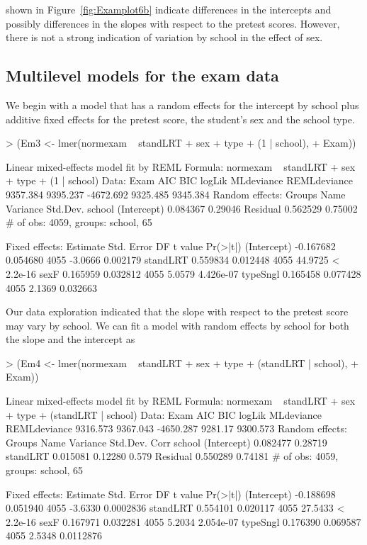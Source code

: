 \documentclass[12pt]{article}
\begin{document}
shown in Figure~\ref{fig:Examplot6b} indicate differences in the
intercepts and possibly differences in the slopes with respect to the
pretest scores.  However, there is not a strong indication of
variation by school in the effect of sex.


\subsection{Multilevel models for the exam data}
\label{sec:ExamModels}

We begin with a model that has a random effects for the intercept by
school plus additive fixed effects for the pretest score, the
student's sex and the school type.
\begin{Schunk}
\begin{Sinput}
> (Em3 <- lmer(normexam ~ standLRT + sex + type + (1 | school), 
+     Exam))
\end{Sinput}
\begin{Soutput}
Linear mixed-effects model fit by REML
Formula: normexam ~ standLRT + sex + type + (1 | school) 
   Data: Exam 
      AIC      BIC    logLik MLdeviance REMLdeviance
 9357.384 9395.237 -4672.692   9325.485     9345.384
Random effects:
 Groups   Name        Variance Std.Dev.
 school   (Intercept) 0.084367 0.29046 
 Residual             0.562529 0.75002 
# of obs: 4059, groups: school, 65

Fixed effects:
               Estimate  Std. Error   DF t value  Pr(>|t|)
(Intercept)   -0.167682    0.054680 4055 -3.0666  0.002179
standLRT       0.559834    0.012448 4055 44.9725 < 2.2e-16
sexF           0.165959    0.032812 4055  5.0579 4.426e-07
typeSngl       0.165458    0.077428 4055  2.1369  0.032663
\end{Soutput}
\end{Schunk}
Our data exploration indicated that the slope with respect to the
pretest score may vary by school.  We can fit a model with random
effects by school for both the slope and the intercept as
\begin{Schunk}
\begin{Sinput}
> (Em4 <- lmer(normexam ~ standLRT + sex + type + (standLRT | school), 
+     Exam))
\end{Sinput}
\begin{Soutput}
Linear mixed-effects model fit by REML
Formula: normexam ~ standLRT + sex + type + (standLRT | school) 
   Data: Exam 
      AIC      BIC    logLik MLdeviance REMLdeviance
 9316.573 9367.043 -4650.287    9281.17     9300.573
Random effects:
 Groups   Name        Variance Std.Dev. Corr  
 school   (Intercept) 0.082477 0.28719        
          standLRT    0.015081 0.12280  0.579 
 Residual             0.550289 0.74181        
# of obs: 4059, groups: school, 65

Fixed effects:
               Estimate  Std. Error   DF t value  Pr(>|t|)
(Intercept)   -0.188698    0.051940 4055 -3.6330 0.0002836
standLRT       0.554101    0.020117 4055 27.5433 < 2.2e-16
sexF           0.167971    0.032281 4055  5.2034 2.054e-07
typeSngl       0.176390    0.069587 4055  2.5348 0.0112876
\end{Soutput}
\end{Schunk}
\end{document}
